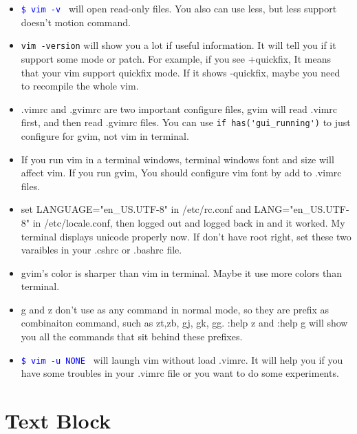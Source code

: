 \documentclass[a4paper,12pt,twoside]{book}
\newcommand{\linuxcommand}[1]{\texttt{\textcolor{blue}{\$ #1 \Pisymbol{psy}{191}}}}
\begin{document}
\begin{itemize}
		\item \linuxcommand{vim -v} will open read-only files. You also can use less, but less support doesn't motion command.

		\item \verb=vim -version= will show you a lot if useful information. It will tell you if it support some mode or patch. For example, if you see +quickfix, It means that your vim support quickfix mode. If it shows -quickfix, maybe you need to recompile the whole vim.

		\item .vimrc and .gvimrc are two important configure files, gvim  will read .vimrc first, and then read .gvimrc files.  You can use \verb=if has('gui_running')= to just configure for gvim, not vim in terminal. 

		\item If you run vim in a terminal windows, terminal windows font and size will affect vim.  If you run gvim, You should configure vim font by add to .vimrc files.  

		\item set LANGUAGE="en\_US.UTF-8" in /etc/rc.conf and LANG="en\_US.UTF-8" in /etc/locale.conf, then logged out and logged back in and it worked. My terminal displays unicode properly now. If don't have root right, set these two varaibles in your .cshrc or .bashrc file.

		\item gvim's color is sharper than vim in terminal.  Maybe it use more colors than terminal.  

		\item g and z don't use as any command in normal mode, so they are prefix as combinaiton command, such as zt,zb, gj, gk, gg. :help z and :help g will show you all the commands that sit behind these prefixes.

		\item \linuxcommand{vim -u NONE} will laungh vim without load .vimrc. It will help you if you have some troubles in your .vimrc file or you want to do some experiments. 
\end{itemize}

\section{Text Block}
\end{document}
